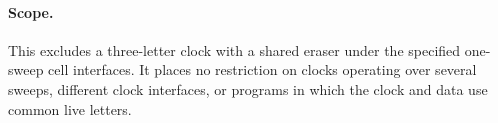 \documentclass{article}
\begin{document}
\paragraph{Scope.}
This excludes a three-letter clock with a shared eraser under the
specified one-sweep cell interfaces. It places no restriction on
clocks operating over several sweeps, different clock interfaces,
or programs in which the clock and data use common live letters.
\end{document}

